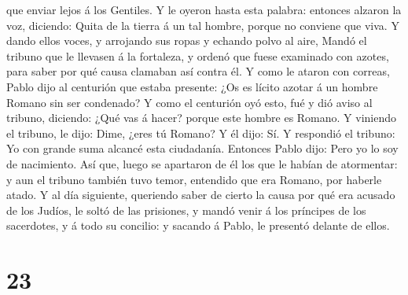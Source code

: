 que enviar lejos á los Gentiles.  Y le oyeron hasta esta
palabra: entonces alzaron la voz, diciendo: Quita de la tierra á un tal
hombre, porque no conviene que viva.  Y dando ellos voces,
y arrojando sus ropas y echando polvo al aire,  Mandó el
tribuno que le llevasen á la fortaleza, y ordenó que fuese examinado con
azotes, para saber por qué causa clamaban así contra él.  Y
como le ataron con correas, Pablo dijo al centurión que estaba presente:
¿Os es lícito azotar á un hombre Romano sin ser condenado? 
Y como el centurión oyó esto, fué y dió aviso al tribuno, diciendo: ¿Qué
vas á hacer? porque este hombre es Romano.  Y viniendo el
tribuno, le dijo: Dime, ¿eres tú Romano? Y él dijo: Sí.  Y
respondió el tribuno: Yo con grande suma alcancé esta ciudadanía.
Entonces Pablo dijo: Pero yo lo soy de nacimiento.  Así
que, luego se apartaron de él los que le habían de atormentar: y aun el
tribuno también tuvo temor, entendido que era Romano, por haberle atado.
 Y al día siguiente, queriendo saber de cierto la causa por
qué era acusado de los Judíos, le soltó de las prisiones, y mandó venir
á los príncipes de los sacerdotes, y á todo su concilio: y sacando á
Pablo, le presentó delante de ellos.

\hypertarget{section-22}{%
\section{23}\label{section-22}}


